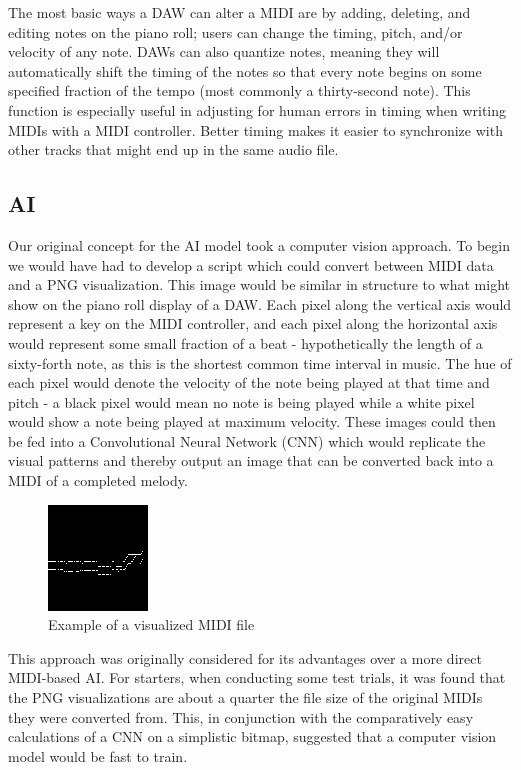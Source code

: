 The most basic ways a DAW can alter a MIDI are by adding, deleting, and editing notes on the
piano roll; users can change the timing, pitch, and/or velocity of any note. DAWs can also
quantize notes, meaning they will automatically shift the timing of the notes so that every
note begins on some specified fraction of the tempo (most commonly a thirty-second note).
This function is especially useful in adjusting for human errors in timing when writing MIDIs
with a MIDI controller. Better timing makes it easier to synchronize with other tracks that might
end up in the same audio file.


\subsection{AI}

Our original concept for the AI model took a computer vision approach. To begin we would
have had to develop a script which could convert between MIDI data and a PNG
visualization. This image would be similar in structure to what might show on the piano
roll display of a DAW. Each pixel along the vertical axis would represent a key on the
MIDI controller, and each pixel along the horizontal axis would represent some small
fraction of a beat - hypothetically the length of a sixty-forth note, as this is the
shortest common time interval in music. The hue of each pixel would denote the velocity
of the note being played at that time and pitch - a black pixel would mean no note is
being played while a white pixel would show a note being played at maximum velocity.
These images could then be fed into a Convolutional Neural Network (CNN) which would
replicate the visual patterns and thereby output an image that can be converted back into
a MIDI of a completed melody.

\begin{figure}[h!]
  \centering
  \includegraphics{image/MIDIsample.png}
  \caption{Example of a visualized MIDI file}
  \label{fig:midi_sample}
\end{figure}

This approach was originally considered for its advantages over a more direct MIDI-based
AI. For starters, when conducting some test trials, it was found that the PNG
visualizations are about a quarter the file size of the original MIDIs they were converted
from. This, in conjunction with the comparatively easy calculations of a CNN on a
simplistic bitmap, suggested that a computer vision model would be fast to train.

